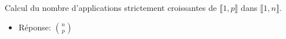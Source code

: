 Calcul du nombre d'applications strictement croissantes de $\llbracket 1, p \rrbracket$ dans $\llbracket 1, n \rrbracket$.

\begin{itemize}
    \item Réponse: $\displaystyle \binom{n}{p}$
\end{itemize}